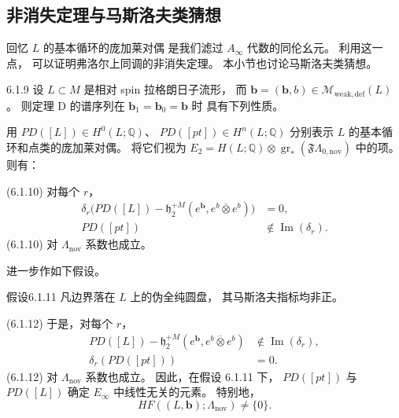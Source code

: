 
\subsection{非消失定理与马斯洛夫类猜想}
\label{subsec:6-1-2}

回忆 $L$ 的基本循环的庞加莱对偶
是我们滤过 $A_\infty$ 代数的同伦幺元。
利用这一点，
可以证明弗洛尔上同调的非消失定理。
本小节也讨论马斯洛夫类猜想。

\begin{theorem}{6.1.9}\label{thm:6-1-9}
设 $L\subset M$ 是相对 spin 拉格朗日子流形，
而 $\mathbf b=(\boldsymbol b,b)
\in\mathcal M_{\mathrm{weak,def}}(L)$。
则定理 D 的谱序列在
$\mathbf b_1=\mathbf b_0=\mathbf b$ 时
具有下列性质。

用
$PD([L])\in H^0(L;\mathbb Q)$、
$PD([pt])\in H^n(L;\mathbb Q)$
分别表示 $L$ 的基本循环和点类的庞加莱对偶。
将它们视为
$E_2=H(L;\mathbb Q)\otimes
\operatorname{gr}_*(\mathfrak F\Lambda_{0,\mathrm{nov}})$
中的项。则有：

\par\smallskip\noindent\textup{(6.1.10)}\quad
对每个 $r$，
\begin{align}
\delta_r\bigl(
 PD([L])-\mathfrak h_2^{+M}
 (e^{\boldsymbol b},e^b\mathbin{\overline\otimes}e^b)
 \bigr)&=0,
\tag{6.1.10.1}\label{eq:6-1-10-1}\\
PD([pt])&\notin\operatorname{Im}(\delta_r).
\tag{6.1.10.2}\label{eq:6-1-10-2}
\end{align}
\textup{(6.1.10)} 对
$\Lambda_{\mathrm{nov}}$ 系数也成立。

\pagebreak[3]
进一步作如下假设。
\begingroup\upshape
\begin{statement}{假设}{6.1.11}\label{ass:6-1-11}
凡边界落在 $L$ 上的伪全纯圆盘，
其马斯洛夫指标均非正。
\end{statement}
\endgroup

\par\smallskip\noindent\textup{(6.1.12)}\quad
于是，对每个 $r$，
\begin{align}
PD([L])-\mathfrak h_2^{+M}
 (e^{\boldsymbol b},e^b\mathbin{\overline\otimes}e^b)
 &\notin\operatorname{Im}(\delta_r),
\tag{6.1.12.1}\label{eq:6-1-12-1}\\
\delta_r(PD([pt]))&=0.
\tag{6.1.12.2}\label{eq:6-1-12-2}
\end{align}
\textup{(6.1.12)} 对
$\Lambda_{\mathrm{nov}}$ 系数也成立。
因此，在假设 6.1.11 下，
$PD([pt])$ 与 $PD([L])$
确定 $E_\infty$ 中线性无关的元素。
特别地，
\[
HF((L,\mathbf b);\Lambda_{\mathrm{nov}})
\ne\{0\}.
\]
\end{theorem}

